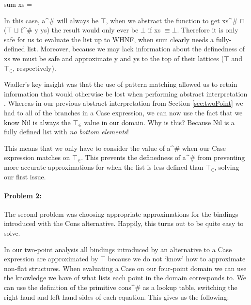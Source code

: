 \begin{haskell*}
sum xs = 
\end{haskell*}

In this case, \<a^{\#}\> will always be $\top$, when we abstract the function
to get \<xs^{\#} \(\sqcap\) (\(\top\) \(\sqcup\) f^{\#} y ys)\> the result
would only ever be $\bot$ if \<xs \(\equiv \bot\)\>. Therefore it is only safe
for us to evaluate the list up to WHNF, when \<sum\> clearly needs a
fully-defined list. Moreover, because we may lack information about
the definedness of \<xs\> we must be safe and approximate \<y\> and \<ys\> to
the top of their lattices ($\top$ and $\top_{\in}$, respectively). 

Wadler's key insight was that the use of pattern matching allowed us to retain
information that would otherwise be lost when performing abstract
interpretation \citep{wadler1987strictness}. Whereas in our previous abstract
interpretation from Section \ref{sec:twoPoint} we had to \join all of the
branches in a \<Case\> expression, we can now use the fact that we know \<Nil\>
is always the $\top_{\in}$ value in our domain.  Why is this?  Because \<Nil\>
is a fully defined list with \emph{no bottom elements}!

This means that we only have to consider the value of \<a^{\#}\> when our
\<Case\> expression matches on $\top_{\in}$. This prevents the definedness
of \<a^{\#}\> from preventing more accurate approximations for when the list is
less defined than $\top_{\in}$, solving our first issue.

\paragraph{Problem 2:} The second problem was choosing appropriate approximations
for the bindings introduced with the \<Cons\> alternative. Happily, this turns out
to be quite easy to solve.

In our two-point analysis all bindings introduced by an alternative to a
\<Case\> expression are approximated by $\top$ because we do not `know' how to
approximate non-flat structures. When evaluating a \<Case\> on our four-point
domain we can use the knowledge we have of what lists each point in the domain
corresponds to. We can use the definition of the primitive \<cons^{\#}\> as
a lookup table, switching the right hand and left hand sides of each equation.
This gives us the following:

